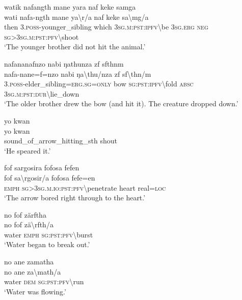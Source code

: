 \ea\label{ex:1:a3577}
watik nafangth mane yara naf keke samga\\
\gll wati	nafa-ngth	mane	ya{\textbackslash}r/a	naf	keke	sa{\textbackslash}mg/a\\
     then	3.\textsc{poss}-younger\_sibling	which	3\textsc{sg}.\textsc{m}:\textsc{pst}:\textsc{ipfv}{\textbackslash}be	3\textsc{sg}.\textsc{erg}	\textsc{neg}	\textsc{sg}>3\textsc{sg}.\textsc{m}:\textsc{pst}:\textsc{pfv}{\textbackslash}shoot\\
\glt `The younger brother did not hit the animal.'
\z

\ea\label{ex:1:a3578}
nafananafnzo nabi ŋathunza zf sfthnm\\
\gll nafa-nane=f=nzo	nabi	ŋa{\textbackslash}thu/nza	zf	sf{\textbackslash}thn/m\\
     3.\textsc{poss}-elder\_sibling=\textsc{erg}.\textsc{sg}=\textsc{only}	bow	\textsc{sg}:\textsc{pst}:\textsc{ipfv}{\textbackslash}fold	\textsc{absc}	3\textsc{sg}.\textsc{m}:\textsc{pst}:\textsc{dur}{\textbackslash}lie\_down\\
\glt `The older brother drew the bow (and hit it). The creature dropped down.'
\z

\ea\label{ex:1:a3580}
yo kwan\\
\gll yo	kwan\\
     sound\_of\_arrow\_hitting\_sth	shout\\
\glt `He speared it.'
\z

\ea\label{ex:1:a3581}
fof sargosira fofosa fefen\\
\gll fof	sa{\textbackslash}rgosir/a	fofosa	fefe=en\\
     \textsc{emph}	\textsc{sg}>3\textsc{sg}.\textsc{m}.\textsc{io}:\textsc{pst}:\textsc{pfv}{\textbackslash}penetrate	heart	real=\textsc{loc}\\
\glt `The arrow bored right through to the heart.'
\z

\ea\label{ex:1:a3582}
no fof zärftha\\
\gll no	fof	zä{\textbackslash}rfth/a\\
     water	\textsc{emph}	\textsc{sg}:\textsc{pst}:\textsc{pfv}{\textbackslash}burst\\
\glt `Water began to break out.'
\z

\ea\label{ex:1:a3583}
no ane zamatha\\
\gll no	ane	za{\textbackslash}math/a\\
     water	\textsc{dem}	\textsc{sg}:\textsc{pst}:\textsc{pfv}{\textbackslash}run\\
\glt `Water was flowing.'
\z

